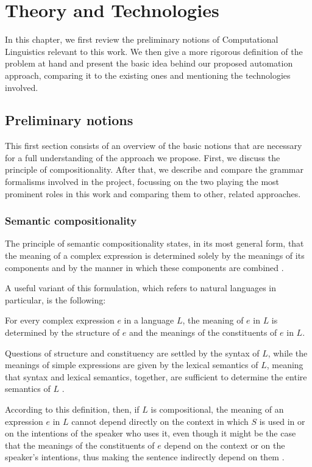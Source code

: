 \chapter{Theory and Technologies} \label{ch2} 
In this chapter, we first review the preliminary notions of Computational Linguistics relevant to this work. 
We then give a more rigorous definition of the problem at hand and present the basic idea behind our proposed automation approach, comparing it to the existing ones and mentioning the technologies involved.

\section{Preliminary notions}
This first section consists of an overview of the basic notions that are necessary for a full understanding of the approach we propose. 
First, we discuss the principle of compositionality. 
After that, we describe and compare the grammar formalisms involved in the project, focussing on the two playing the most prominent roles in this work and comparing them to other, related approaches.

\subsection{Semantic compositionality}
The principle of semantic compositionality states, in its most general form, that the meaning of a complex expression is determined solely by the meanings of its components and by the manner in which these components are combined \cite{frege}. \smallskip 

A useful variant of this formulation, which refers to natural languages in particular, is the following: \smallskip

\begin{definition} \label{sc}
For every complex expression $e$ in a language $L$, the meaning of $e$ in $L$ is determined by the structure of $e$ and the meanings of the constituents of $e$ in $L$.
\end{definition}
\smallskip

Questions of structure and constituency are settled by the syntax of $L$, while the meanings of simple expressions are given by the lexical semantics of $L$, meaning that syntax and lexical semantics, together, are sufficient to determine the entire semantics of $L$ \cite{frege}. \smallskip

According to this definition, then, if $L$ is compositional, the meaning of an expression $e$ in $L$ cannot depend directly on the context in which $S$ is used in or on the intentions of the speaker who uses it, even though it might be the case that the meanings of the constituents of $e$ depend on the context or on the speaker's intentions, thus making the sentence indirectly depend on them \cite{semcom2}. \smallskip

